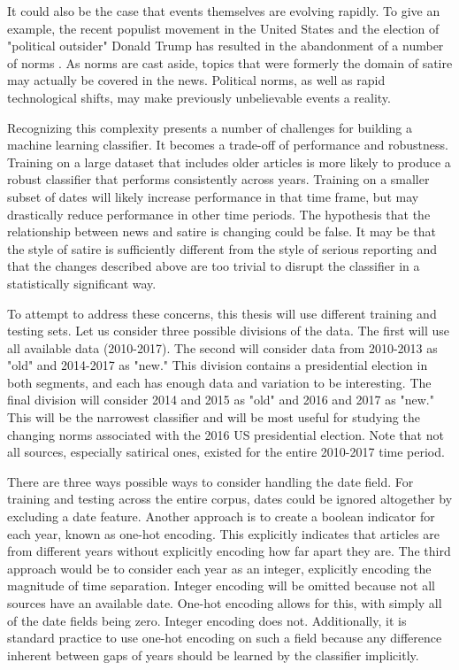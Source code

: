 \documentclass [12 pt] {report}
\begin{document}
It could also be the case that events themselves are evolving rapidly. To give an example, the recent populist movement in the United States and the election of "political outsider" Donald Trump has resulted in the abandonment of a number of norms \cite{norms}. As norms are cast aside, topics that were formerly the domain of satire may actually be covered in the news. Political norms, as well as rapid technological shifts, may make previously unbelievable events a reality.

Recognizing this complexity presents a number of challenges for building a machine learning classifier. It becomes a trade-off of performance and robustness. Training on a large dataset that includes older articles is more likely to produce a robust classifier that performs consistently across years. Training on a smaller subset of dates will likely increase performance in that time frame, but may drastically reduce performance in other time periods. The hypothesis that the relationship between news and satire is changing could be false. It may be that the style of satire is sufficiently different from the style of serious reporting and that the changes described above are too trivial to disrupt the classifier in a statistically significant way.

To attempt to address these concerns, this thesis will use different training and testing sets. Let us consider three possible divisions of the data. The first will use all available data (2010-2017). The second will consider data from 2010-2013 as "old" and 2014-2017 as "new." This division contains a presidential election in both segments, and each has enough data and variation to be interesting. The final division will consider 2014 and 2015 as "old" and 2016 and 2017 as "new." This will be the narrowest classifier and will be most useful for studying the changing norms associated with the 2016 US presidential election. Note that not all sources, especially satirical ones, existed for the entire 2010-2017 time period.

There are three ways possible ways to consider handling the date field. For training and testing across the entire corpus, dates could be ignored altogether by excluding a date feature. Another approach is to create a boolean indicator for each year, known as one-hot encoding. This explicitly indicates that articles are from different years without explicitly encoding how far apart they are. The third approach would be to consider each year as an integer, explicitly encoding the magnitude of time separation. Integer encoding will be omitted because not all sources have an available date. One-hot encoding allows for this, with simply all of the date fields being zero. Integer encoding does not. Additionally, it is standard practice to use one-hot encoding on such a field because any difference inherent between gaps of years should be learned by the classifier implicitly.
\end{document}
